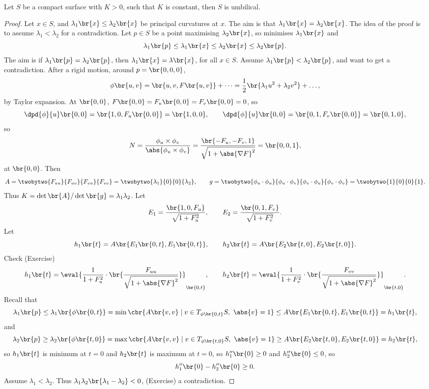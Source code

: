 
\begin{theorem}
Let $ S $ be a compact surface with $ K > 0 $, such that $ K $ is constant, then $ S $ is umbilical.
\end{theorem}

\begin{proof}
Let $ x \in S $, and $ \lambda_1\br{x} \le \lambda_2\br{x} $ be principal curvatures at $ x $. The aim is that $ \lambda_1\br{x} = \lambda_2\br{x} $. The idea of the proof is to assume $ \lambda_1 < \lambda_2 $ for a contradiction. Let $ p \in S $ be a point maximising $ \lambda_2\br{x} $, so minimises $ \lambda_1\br{x} $ and
$$ \lambda_1\br{p} \le \lambda_1\br{x} \le \lambda_2\br{x} \le \lambda_2\br{p}. $$
The aim is if $ \lambda_1\br{p} = \lambda_2\br{p} $, then $ \lambda_1\br{x} = \lambda\br{x} $, for all $ x \in S $. Assume $ \lambda_1\br{p} < \lambda_2\br{p} $, and want to get a contradiction. After a rigid motion, around $ p = \br{0, 0, 0} $,
$$ \phi\br{u, v} = \br{u, v, F\br{u, v}} + \dots = \dfrac{1}{2}\br{\lambda_1u^2 + \lambda_2v^2} + \dots, $$
by Taylor expansion. At $ \br{0, 0} $, $ F\br{0, 0} = F_u\br{0, 0} = F_v\br{0, 0} = 0 $, so
$$ \dpd{\phi}{u}\br{0, 0} = \br{1, 0, F_u\br{0, 0}} = \br{1, 0, 0}, \qquad \dpd{\phi}{u}\br{0, 0} = \br{0, 1, F_v\br{0, 0}} = \br{0, 1, 0}, $$
so
$$ N = \dfrac{\phi_u \times \phi_v}{\abs{\phi_u \times \phi_v}} = \dfrac{\br{-F_u, -F_v, 1}}{\sqrt{1 + \abs{\nabla F}^2}} = \br{0, 0, 1}, $$
at $ \br{0, 0} $. Then
$$ A = \twobytwo{F_{uu}}{F_{uv}}{F_{vu}}{F_{vv}} = \twobytwo{\lambda_1}{0}{0}{\lambda_2}, \qquad g = \twobytwo{\phi_u \cdot \phi_u}{\phi_u \cdot \phi_v}{\phi_v \cdot \phi_u}{\phi_v \cdot \phi_v} = \twobytwo{1}{0}{0}{1}. $$
Thus $ K = \det\br{A} / \det\br{g} = \lambda_1\lambda_2 $. Let
$$ E_1 = \dfrac{\br{1, 0, F_u}}{\sqrt{1 + F_u^2}}, \qquad E_2 = \dfrac{\br{0, 1, F_v}}{\sqrt{1 + F_v^2}}. $$
Let
$$ h_1\br{t} = A\br{E_1\br{0, t}, E_1\br{0, t}}, \qquad h_2\br{t} = A\br{E_2\br{t, 0}, E_2\br{t, 0}}. $$
Check (Exercise)
$$ h_1\br{t} = \eval{\dfrac{1}{1 + F_u^2} \cdot \br{\dfrac{F_{uu}}{\sqrt{1 + \abs{\nabla F}^2}}}}_{\br{0, t}}, \qquad h_2\br{t} = \eval{\dfrac{1}{1 + F_v^2} \cdot \br{\dfrac{F_{vv}}{\sqrt{1 + \abs{\nabla F}^2}}}}_{\br{t, 0}}. $$
Recall that
$$ \lambda_1\br{p} \le \lambda_1\br{\phi\br{0, t}} = \min\cbr{A\br{v, v} \mid v \in T_{\phi\br{0, t}}S, \ \abs{v} = 1} \le A\br{E_1\br{0, t}, E_1\br{0, t}} = h_1\br{t}, $$
and
$$ \lambda_2\br{p} \ge \lambda_2\br{\phi\br{t, 0}} = \max\cbr{A\br{v, v} \mid v \in T_{\phi\br{t, 0}}S, \ \abs{v} = 1} \ge A\br{E_2\br{t, 0}, E_2\br{t, 0}} = h_2\br{t}, $$
so $ h_1\br{t} $ is minimum at $ t = 0 $ and $ h_2\br{t} $ is maximum at $ t = 0 $, so $ h_1''\br{0} \ge 0 $ and $ h_2''\br{0} \le 0 $, so
$$ h_1''\br{0} - h_2''\br{0} \ge 0. $$
Assume $ \lambda_1 < \lambda_2 $. Thus $ \lambda_1\lambda_2\br{\lambda_1 - \lambda_2} < 0 $, (Exercise) a contradiction.
\end{proof}

